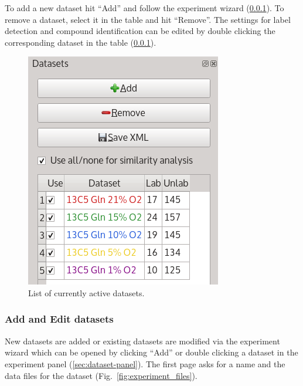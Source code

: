 \documentclass[a4paper,12pt]{scrartcl}
\begin{document}
To add a new dataset hit ``Add'' and follow the experiment wizard (\ref{sec:experiment-wizard}). To remove a dataset, select it in the table and hit ``Remove''. The settings for label detection and compound identification can be edited by double clicking the corresponding dataset in the table (\ref{sec:experiment-wizard}).


\begin{figure}[htb]
 \centering
 \includegraphics[width=0.4\linewidth]{./gfx/ss_experiment_panel.png}
 \caption{List of currently active datasets.}
 \label{fig:experiment-panel}
\end{figure}

\subsubsection{Add and Edit datasets}
\label{sec:experiment-wizard}

New datasets are added or existing datasets are modified via the experiment wizard which can be opened by clicking ``Add'' or double clicking a dataset in the experiment panel (\ref{sec:dataset-panel}). The first page asks for a name and the data files for the dataset (Fig.~\ref{fig:experiment_files}).
\end{document}
